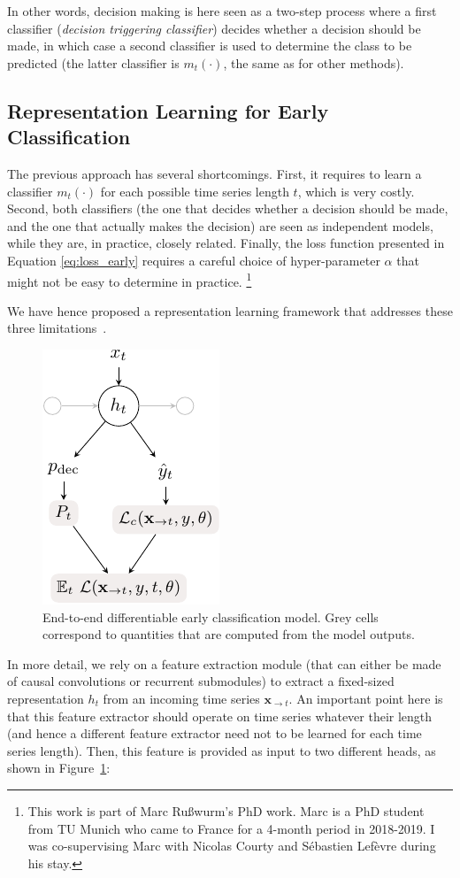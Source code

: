 In other words, decision making is here seen as a two-step process where a
first classifier (\emph{decision triggering classifier}) decides whether a decision
should be made, in which case a
second classifier is used to determine the class to be predicted (the latter
classifier is $m_t(\cdot)$, the same as for other methods).

\subsection{Representation Learning for Early Classification}

The previous approach has several shortcomings.
First, it requires to learn a classifier $m_t(\cdot)$ for each possible time
series length $t$, which is very costly.
Second, both classifiers (the one that decides whether a decision should be
made, and the one that actually makes the decision) are seen as independent
models, while they are, in practice, closely related.
Finally, the loss function presented in Equation \eqref{eq:loss_early} requires
a careful choice of hyper-parameter $\alpha$ that might not be easy to
determine in
practice.%
\footnote{This work is part of Marc Rußwurm's PhD work.
Marc is a PhD student from TU Munich who came to France for a
4-month period in 2018-2019. I was co-supervising Marc with Nicolas Courty
and Sébastien Lefèvre during his stay.}

We have hence proposed a representation learning framework that
addresses these three limitations~\cite{ruwurm:hal-02174314}.

\begin{figure}[t]
\centering
\includegraphics[width=.3\textwidth]{fig/early_module_cropped}
\caption{End-to-end differentiable early classification model.
Grey cells correspond to quantities that are
computed from the model outputs. \label{fig:early}}
\end{figure}

In more detail, we rely on a feature extraction module (that can either be
made of causal convolutions or recurrent submodules) to extract a fixed-sized
representation $h_t$ from an incoming time series $\mathbf{x}_{\rightarrow t}$.
An important point here is that this feature extractor should operate on time
series whatever their length (and hence a different feature extractor need not
to be learned for each time series length).
Then, this feature is provided as input to two different heads, as shown in
Figure~\ref{fig:early}:


